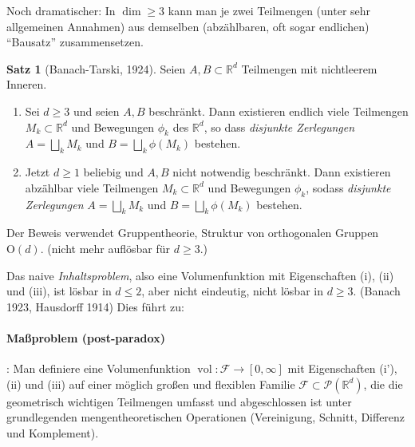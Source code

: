 \documentclass[12pt,a4paper]{article}
\theoremstyle{definition}
\newtheorem*{satz}{Satz}
\theoremstyle{remark}
\newcommand{\R}{\mathbb{R}}
\newcommand{\vol}{\operatorname{vol}}
\begin{document}
Noch dramatischer: In $\dim \geq 3$ kann man je zwei Teilmengen (unter sehr allgemeinen Annahmen) aus demselben (abzählbaren, oft sogar endlichen) ``Bausatz'' zusammensetzen.
\begin{satz}[Banach-Tarski, 1924] Seien $A,B\subset \R^d$ Teilmengen mit nichtleerem Inneren.
\begin{enumerate}[(\roman*)]
\item Sei $d \geq 3$ und seien $A,B$ beschränkt. Dann existieren endlich viele Teilmengen $M_k \subset \R^d$ und Bewegungen $\phi_k$ des $\R^d$, so dass \emph{disjunkte Zerlegungen} $A=\bigsqcup_k M_k$ und $B = \bigsqcup_k \phi(M_k)$ bestehen.
\item Jetzt $d\geq 1$ beliebig und $A,B$ nicht notwendig beschränkt. Dann existieren abzählbar viele Teilmengen $M_k \subset \R^d$ und Bewegungen $\phi_k$, sodass  \emph{disjunkte Zerlegungen} $A=\bigsqcup_k M_k$ und $B = \bigsqcup_k \phi(M_k)$ bestehen.
\end{enumerate}
Der Beweis verwendet Gruppentheorie, Struktur von orthogonalen Gruppen $\mathrm{O}(d)$. (nicht mehr auflösbar für $d\geq 3$.)
\end{satz}
Das naive \emph{Inhaltsproblem}, also eine Volumenfunktion mit Eigenschaften (i), (ii) und (iii), ist lösbar in $d\leq 2$, aber nicht eindeutig, nicht lösbar in $d\geq 3$. (Banach 1923, Hausdorff 1914) Dies führt zu:
\vspace{-10pt}
\paragraph{Maßproblem (post-paradox)}: Man definiere eine Volumenfunktion $\vol: \mathcal{F} \longrightarrow [0,\infty]$ mit Eigenschaften (i'), (ii) und (iii) auf einer möglich großen und flexiblen Familie $\mathcal{F} \subset \mathcal{P}(\R^d)$, die die geometrisch wichtigen Teilmengen umfasst und abgeschlossen ist unter grundlegenden mengentheoretischen Operationen (Vereinigung, Schnitt, Differenz und Komplement). 
\end{document}
